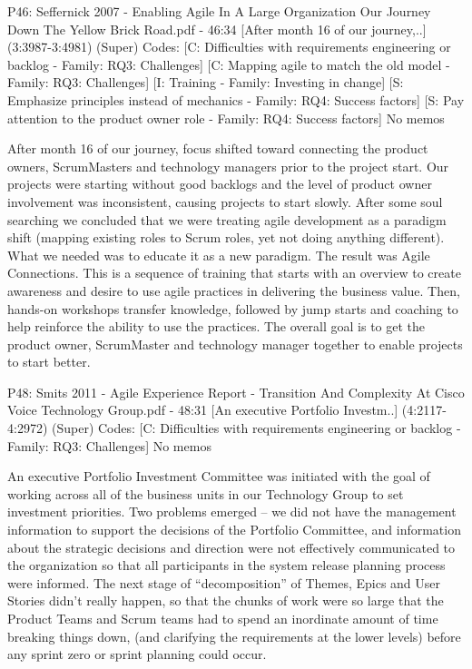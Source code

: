 \documentclass[preprint,authoryear,12pt]{elsarticle}
\begin{document}
P46: Seffernick 2007 - Enabling Agile In A Large Organization Our Journey Down The Yellow Brick Road.pdf - 46:34 [After month 16 of our journey,..]  (3:3987-3:4981)   (Super)
Codes:	[C: Difficulties with requirements engineering or backlog - Family: RQ3: Challenges] [C: Mapping agile to match the old model - Family: RQ3: Challenges] [I: Training - Family: Investing in change] [S: Emphasize principles instead of mechanics - Family: RQ4: Success factors] [S: Pay attention to the product owner role - Family: RQ4: Success factors] 
No memos

After month 16 of our journey, focus shifted 
toward connecting the product owners, ScrumMasters 
and technology managers prior to the project start. Our 
projects were starting without good backlogs and the 
level of product owner involvement was inconsistent, 
causing projects to start slowly. After some soul 
searching we concluded that we were treating agile 
development as a paradigm shift (mapping existing 
roles to Scrum roles, yet not doing anything different). 
What we needed was to educate it as a new paradigm. 
The result was Agile Connections. This is a sequence 
of training that starts with an overview to create 
awareness and desire to use agile practices in 
delivering the business value. Then, hands-on 
workshops transfer knowledge, followed by jump 
starts and coaching to help reinforce the ability to use 
the practices. The overall goal is to get the product 
owner, ScrumMaster and technology manager together 
to enable projects to start better.


P48: Smits 2011 - Agile Experience Report - Transition And Complexity At Cisco Voice Technology Group.pdf - 48:31 [An executive Portfolio Investm..]  (4:2117-4:2972)   (Super)
Codes:	[C: Difficulties with requirements engineering or backlog - Family: RQ3: Challenges] 
No memos

An executive Portfolio Investment Committee was 
initiated with the goal of working across all of the 
business units in our Technology Group to set 
investment priorities. Two problems emerged – we 
did not have the management information to support 
the decisions of the Portfolio Committee, and 
information about the strategic decisions and 
direction were not effectively communicated to the 
organization so that all participants in the system 
release planning process were informed. The next 
stage of “decomposition” of Themes, Epics and User 
Stories didn’t really happen, so that the chunks of 
work were so large that the Product Teams and 
Scrum teams had to spend an inordinate amount of 
time breaking things down, (and clarifying the 
requirements at the lower levels) before any sprint 
zero or sprint planning could occur.
\end{document}
